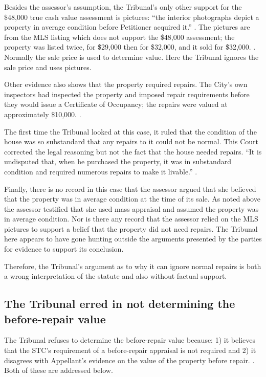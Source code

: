 \documentclass[12pt,\documentclassflag]{michiganCourtOfAppealsBrief}
\begin{document}
Besides the assessor's assumption, the Tribunal's only other support for the \$48,000 true cash value assessment is pictures: ``the interior photographs depict a property in average condition before Petitioner acquired it.'' \reconsiderationDenied[2]. The pictures are from the MLS listing which does not support the \$48,000 assessment; the property was listed twice, for \$29,000 then for \$32,000, and it sold for \$32,000. \mlsHistory[]. Normally the sale price is used to determine value. Here the Tribunal ignores the sale price and uses pictures.

Other evidence also shows that the property required repairs. The City's own inspectors had inspected the property and imposed repair requirements before they would issue a Certificate of Occupancy; the repairs were valued at approximately \$10,000. \repairs. 

The first time the Tribunal looked at this case, it ruled that the condition of the house was so substandard that any repairs to it could not be normal. This Court corrected the legal reasoning but not the fact that the house needed repairs. ``It is undisputed that, when he purchased the property, it was in substandard condition and required numerous repairs to make it livable.'' .

Finally, there is no record in this case that the assessor argued that she believed that the property was in average condition at the time of its sale. As noted above the assessor testified that she used mass appraisal and assumed the property was in average condition. Nor is there any record that the assessor relied on the MLS pictures to support a belief that the property did not need repairs. The Tribunal here appears to have gone hunting outside the arguments presented by the parties for evidence to support its conclusion.

Therefore, the Tribunal's argument as to why it can ignore normal repairs is both a wrong interpretation of the statute and also without factual support.

\subsection{The Tribunal erred in not determining the before-repair value}

The Tribunal refuses to determine the before-repair value because:
1) it believes that the STC's requirement of a before-repair appraisal is not required
and
2) it disagrees with Appellant's evidence on the value of the property before repair.
\reconsiderationDenied[2]. Both of these are addressed below.
\end{document}
